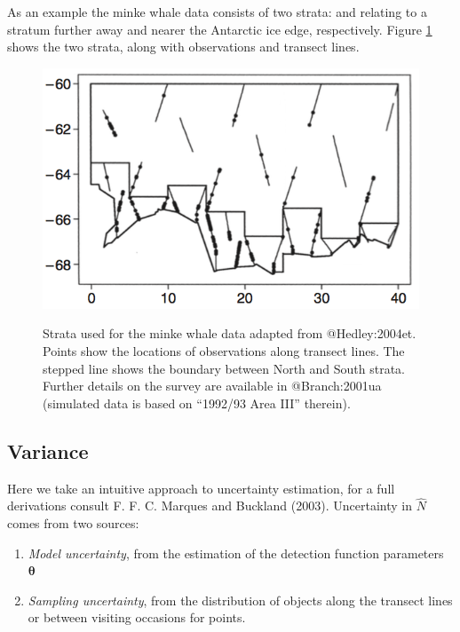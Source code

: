 \documentclass[article]{jss}
\begin{document}
As an example the minke whale data consists of two strata: 
and  relating to a stratum further away and nearer the
Antarctic ice edge, respectively. Figure \ref{fig:minke-strata} shows
the two strata, along with observations and transect lines.

\begin{figure}
\includegraphics{minke-strata}
\label{fig:minke-strata}
\caption{Strata used for the minke whale data adapted from @Hedley:2004et. Points show the locations of observations along transect lines. The stepped line shows the boundary between North and South strata. Further details on the survey are available in @Branch:2001ua (simulated data is based on ``1992/93 Area III'' therein).}
\end{figure}

\subsection{Variance}\label{variance}

Here we take an intuitive approach to uncertainty estimation, for a full
derivations consult F. F. C. Marques and Buckland (2003). Uncertainty in
\(\hat{N}\) comes from two sources:

\begin{enumerate}
\def\labelenumi{\arabic{enumi}.}
\itemsep1pt\parskip0pt
\item
  \emph{Model uncertainty}, from the estimation of the detection
  function parameters \(\boldsymbol{\theta}\)
\item
  \emph{Sampling uncertainty}, from the distribution of objects along
  the transect lines or between visiting occasions for points.
\end{enumerate}
\end{document}
